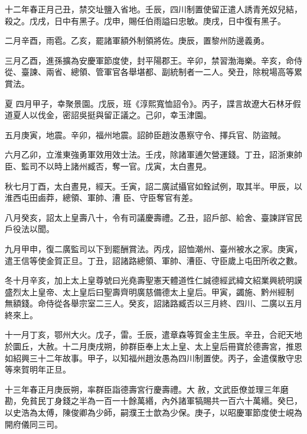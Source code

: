 \begin{pinyinscope}
 十二年春正月己丑，禁交址鹽入省地。壬辰，四川制置使留正遣人誘青羌奴兒結，殺之。戊戌，日中有黑子。戊申，賜任伯雨謚曰忠敏。庚戌，日中復有黑子。



 二月辛酉，雨雹。乙亥，罷諸軍額外制領將佐。庚辰，置黎州防邊義勇。



 三月乙酉，進孫擴為安慶軍節度使，封平陽郡王。辛卯，禁習渤海樂。辛亥，命侍從、臺諫、兩省、總領、管軍官各舉堪都、副統制者一二人。癸丑，除稅場高等累賞法。



 夏
 四月甲子，幸聚景園。戊辰，班《淳熙寬恤詔令》。丙子，諜言故遼大石林牙假道夏人以伐金，密詔吳挺與留正議之。己卯，幸玉津園。



 五月庚寅，地震。辛卯，福州地震。詔帥臣趙汝愚察守令、擇兵官、防盜賊。



 六月乙卯，立淮東強勇軍效用效士法。壬戌，除諸軍逋欠營運錢。丁丑，詔浙東帥臣、監司不以時上諸州臧否，奪一官。戊寅，太白晝見。



 秋七月丁酉，太白晝見，經天。壬寅，詔二廣試攝官如銓試例，取其半。甲辰，以淮西屯田鹵莽，總領、軍帥、漕
 臣、守臣奪官有差。



 八月癸亥，詔太上皇壽八十，令有司議慶壽禮。乙丑，詔戶部、給舍、臺諫詳官民戶役法以聞。



 九月甲申，復二廣監司以下到罷酬賞法。丙戌，詔恤潮州、臺州被水之家。庚寅，遣王信等使金賀正旦。丁丑，詔諸路總領、軍帥、漕臣、守臣歲上屯田所收之數。



 冬十月辛亥，加上太上皇尊號曰光堯壽聖憲天體道性仁誠德經武緯文紹業興統明謨盛烈太上皇帝、太上皇后曰聖壽齊明廣慈備德太上皇后。甲寅，蠲施、黔州經制
 無額錢。命侍從各舉宗室二三人。癸亥，詔諸路臧否以三月終、四川、二廣以五月終來上。



 十一月丁亥，鄂州大火。戊子，雷。壬辰，遣章森等賀金主生辰。辛丑，合祀天地於圜丘，大赦。十二月庚戌朔，帥群臣奉上太上皇、太上皇后冊寶於德壽宮，推恩如紹興三十二年故事。甲子，以知福州趙汝愚為四川制置使。丙子，金遣僕散守忠等來賀明年正旦。



 十三年春正月庚辰朔，率群臣詣德壽宮行慶壽禮。大
 赦，文武臣僚並理三年磨勘，免貧民丁身錢之半為一百一十餘萬緡，內外諸軍犒賜共一百六十萬緡。癸巳，以史浩為太傅，陳俊卿為少師，嗣濮王士歆為少保。庚子，以昭慶軍節度使士峴為開府儀同三司。




\end{pinyinscope}
